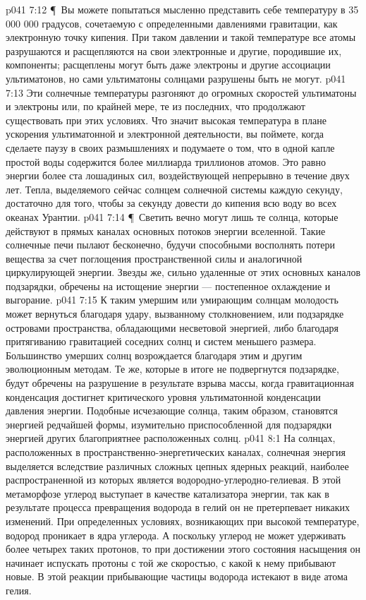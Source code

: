\vs p041 7:12 \P\ Вы можете попытаться мысленно представить себе температуру в 35 000 000 градусов, сочетаемую с определенными давлениями гравитации, как электронную точку кипения. При таком давлении и такой температуре все атомы разрушаются и расщепляются на свои электронные и другие, породившие их, компоненты; расщеплены могут быть даже электроны и другие ассоциации ультиматонов, но сами ультиматоны солнцами разрушены быть не могут.
\vs p041 7:13 Эти солнечные температуры разгоняют до огромных скоростей ультиматоны и электроны или, по крайней мере, те из последних, что продолжают существовать при этих условиях. Что значит высокая температура в плане ускорения ультиматонной и электронной деятельности, вы поймете, когда сделаете паузу в своих размышлениях и подумаете о том, что в одной капле простой воды содержится более миллиарда триллионов атомов. Это равно энергии более ста лошадиных сил, воздействующей непрерывно в течение двух лет. Тепла, выделяемого сейчас солнцем солнечной системы каждую секунду, достаточно для того, чтобы за секунду довести до кипения всю воду во всех океанах Урантии.
\vs p041 7:14 \P\ Светить вечно могут лишь те солнца, которые действуют в прямых каналах основных потоков энергии вселенной. Такие солнечные печи пылают бесконечно, будучи способными восполнять потери вещества за счет поглощения пространственной силы и аналогичной циркулирующей энергии. Звезды же, сильно удаленные от этих основных каналов подзарядки, обречены на истощение энергии --- постепенное охлаждение и выгорание.
\vs p041 7:15 К таким умершим или умирающим солнцам молодость может вернуться благодаря удару, вызванному столкновением, или подзарядке островами пространства, обладающими несветовой энергией, либо благодаря притягиванию гравитацией соседних солнц и систем меньшего размера. Большинство умерших солнц возрождается благодаря этим и другим эволюционным методам. Те же, которые в итоге не подвергнутся подзарядке, будут обречены на разрушение в результате взрыва массы, когда гравитационная конденсация достигнет критического уровня ультиматонной конденсации давления энергии. Подобные исчезающие солнца, таким образом, становятся энергией редчайшей формы, изумительно приспособленной для подзарядки энергией других благоприятнее расположенных солнц.
\vs p041 8:1 На солнцах, расположенных в пространственно\hyp{}энергетических каналах, солнечная энергия выделяется вследствие различных сложных цепных ядерных реакций, наиболее распространенной из которых является водородно\hyp{}углеродно\hyp{}гелиевая. В этой метаморфозе углерод выступает в качестве катализатора энергии, так как в результате процесса превращения водорода в гелий он не претерпевает никаких изменений. При определенных условиях, возникающих при высокой температуре, водород проникает в ядра углерода. А поскольку углерод не может удерживать более четырех таких протонов, то при достижении этого состояния насыщения он начинает испускать протоны с той же скоростью, с какой к нему прибывают новые. В этой реакции прибывающие частицы водорода истекают в виде атома гелия.
